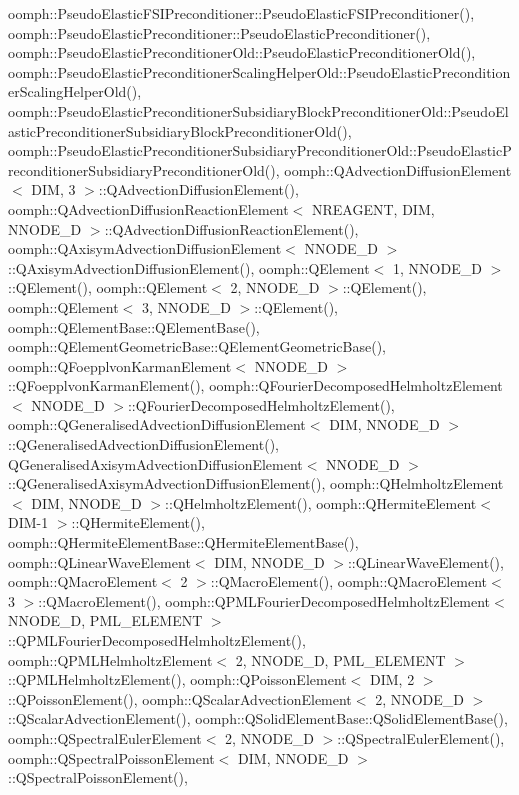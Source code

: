 oomph\+::\+Pseudo\+Elastic\+F\+S\+I\+Preconditioner\+::\+Pseudo\+Elastic\+F\+S\+I\+Preconditioner(), oomph\+::\+Pseudo\+Elastic\+Preconditioner\+::\+Pseudo\+Elastic\+Preconditioner(), oomph\+::\+Pseudo\+Elastic\+Preconditioner\+Old\+::\+Pseudo\+Elastic\+Preconditioner\+Old(), oomph\+::\+Pseudo\+Elastic\+Preconditioner\+Scaling\+Helper\+Old\+::\+Pseudo\+Elastic\+Preconditioner\+Scaling\+Helper\+Old(), oomph\+::\+Pseudo\+Elastic\+Preconditioner\+Subsidiary\+Block\+Preconditioner\+Old\+::\+Pseudo\+Elastic\+Preconditioner\+Subsidiary\+Block\+Preconditioner\+Old(), oomph\+::\+Pseudo\+Elastic\+Preconditioner\+Subsidiary\+Preconditioner\+Old\+::\+Pseudo\+Elastic\+Preconditioner\+Subsidiary\+Preconditioner\+Old(), oomph\+::\+Q\+Advection\+Diffusion\+Element$<$ D\+I\+M, 3 $>$\+::\+Q\+Advection\+Diffusion\+Element(), oomph\+::\+Q\+Advection\+Diffusion\+Reaction\+Element$<$ N\+R\+E\+A\+G\+E\+N\+T, D\+I\+M, N\+N\+O\+D\+E\+\_\+D $>$\+::\+Q\+Advection\+Diffusion\+Reaction\+Element(), oomph\+::\+Q\+Axisym\+Advection\+Diffusion\+Element$<$ N\+N\+O\+D\+E\+\_\+D $>$\+::\+Q\+Axisym\+Advection\+Diffusion\+Element(), oomph\+::\+Q\+Element$<$ 1, N\+N\+O\+D\+E\+\_\+D $>$\+::\+Q\+Element(), oomph\+::\+Q\+Element$<$ 2, N\+N\+O\+D\+E\+\_\+D $>$\+::\+Q\+Element(), oomph\+::\+Q\+Element$<$ 3, N\+N\+O\+D\+E\+\_\+D $>$\+::\+Q\+Element(), oomph\+::\+Q\+Element\+Base\+::\+Q\+Element\+Base(), oomph\+::\+Q\+Element\+Geometric\+Base\+::\+Q\+Element\+Geometric\+Base(), oomph\+::\+Q\+Foepplvon\+Karman\+Element$<$ N\+N\+O\+D\+E\+\_\+D $>$\+::\+Q\+Foepplvon\+Karman\+Element(), oomph\+::\+Q\+Fourier\+Decomposed\+Helmholtz\+Element$<$ N\+N\+O\+D\+E\+\_\+D $>$\+::\+Q\+Fourier\+Decomposed\+Helmholtz\+Element(), oomph\+::\+Q\+Generalised\+Advection\+Diffusion\+Element$<$ D\+I\+M, N\+N\+O\+D\+E\+\_\+D $>$\+::\+Q\+Generalised\+Advection\+Diffusion\+Element(), Q\+Generalised\+Axisym\+Advection\+Diffusion\+Element$<$ N\+N\+O\+D\+E\+\_\+D $>$\+::\+Q\+Generalised\+Axisym\+Advection\+Diffusion\+Element(), oomph\+::\+Q\+Helmholtz\+Element$<$ D\+I\+M, N\+N\+O\+D\+E\+\_\+D $>$\+::\+Q\+Helmholtz\+Element(), oomph\+::\+Q\+Hermite\+Element$<$ D\+I\+M-\/1 $>$\+::\+Q\+Hermite\+Element(), oomph\+::\+Q\+Hermite\+Element\+Base\+::\+Q\+Hermite\+Element\+Base(), oomph\+::\+Q\+Linear\+Wave\+Element$<$ D\+I\+M, N\+N\+O\+D\+E\+\_\+D $>$\+::\+Q\+Linear\+Wave\+Element(), oomph\+::\+Q\+Macro\+Element$<$ 2 $>$\+::\+Q\+Macro\+Element(), oomph\+::\+Q\+Macro\+Element$<$ 3 $>$\+::\+Q\+Macro\+Element(), oomph\+::\+Q\+P\+M\+L\+Fourier\+Decomposed\+Helmholtz\+Element$<$ N\+N\+O\+D\+E\+\_\+D, P\+M\+L\+\_\+\+E\+L\+E\+M\+E\+N\+T $>$\+::\+Q\+P\+M\+L\+Fourier\+Decomposed\+Helmholtz\+Element(), oomph\+::\+Q\+P\+M\+L\+Helmholtz\+Element$<$ 2, N\+N\+O\+D\+E\+\_\+D, P\+M\+L\+\_\+\+E\+L\+E\+M\+E\+N\+T $>$\+::\+Q\+P\+M\+L\+Helmholtz\+Element(), oomph\+::\+Q\+Poisson\+Element$<$ D\+I\+M, 2 $>$\+::\+Q\+Poisson\+Element(), oomph\+::\+Q\+Scalar\+Advection\+Element$<$ 2, N\+N\+O\+D\+E\+\_\+D $>$\+::\+Q\+Scalar\+Advection\+Element(), oomph\+::\+Q\+Solid\+Element\+Base\+::\+Q\+Solid\+Element\+Base(), oomph\+::\+Q\+Spectral\+Euler\+Element$<$ 2, N\+N\+O\+D\+E\+\_\+D $>$\+::\+Q\+Spectral\+Euler\+Element(), oomph\+::\+Q\+Spectral\+Poisson\+Element$<$ D\+I\+M, N\+N\+O\+D\+E\+\_\+D $>$\+::\+Q\+Spectral\+Poisson\+Element(), 